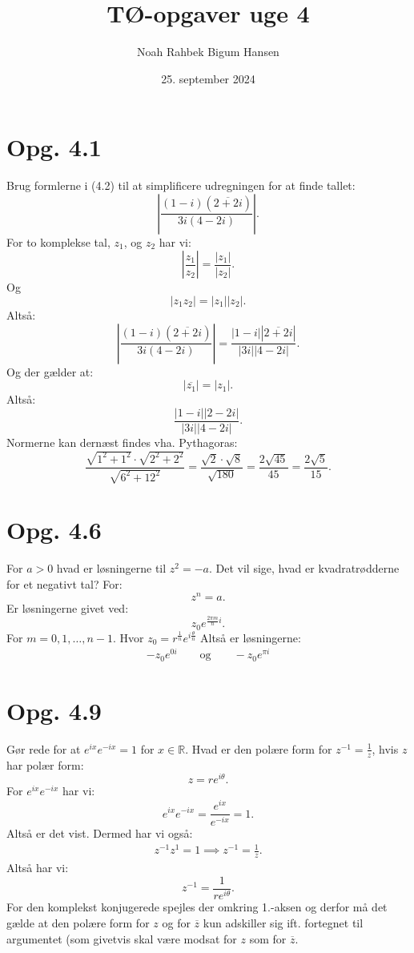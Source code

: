 \documentclass[12pt]{article}
\title{TØ-opgaver uge 4}
\author{Noah Rahbek Bigum Hansen}
\date{25. september 2024}
\begin{document}
  \section*{Opg. 4.1}
    Brug formlerne i (4.2) til at simplificere udregningen for at finde tallet:
    \[
    \left| \frac{\left( 1-i \right) \left( \overline{2+2i} \right)}{3i(4-2i)} \right|
    .\] 
    \bigbreak
    For to komplekse tal, $z_1$, og  $z_2$ har vi:
    \[
    |\frac{z_1}{z_2}| = \frac{|z_1|}{|z_2|}
    .\] 
    Og
    \[
    |z_1z_2| = |z_1| |z_2|
    .\] 
    Altså:
    \[
    \left| \frac{\left( 1-i \right) \left( \overline{2+2i} \right)}{3i(4-2i)} \right| = \frac{|1-i| |\overline{2+2i}|}{|3i| |4-2i|}
    .\] 
    Og der gælder at:
    \[
    |\overline{z_1}| = |z_1|
    .\] 
    Altså:
    \[
    \frac{|1-i| |2-2i|}{|3i| |4-2i|}
    .\]
    Normerne kan dernæst findes vha. Pythagoras:
    \[
      \frac{\sqrt{1^2 + 1^2}\cdot \sqrt{2^2+2^2} }{\sqrt{6^2+12^2}} = \frac{\sqrt{2}\cdot \sqrt{8}}{\sqrt{180}} = \frac{2 \sqrt{45}}{45} = \frac{2 \sqrt{5} }{15}
    .\]

  \section*{Opg. 4.6}
  For $a > 0$ hvad er løsningerne til $z^2=-a$. Det vil sige, hvad er kvadratrødderne for et negativt tal?
  \bigbreak
  For:
  \[
  z^n = a
  .\] 
  Er løsningerne givet ved:
  \[
  z_0e^{\frac{2\pi m}{n}i}
  .\]
  For $m = 0,1,\ldots,n-1$. Hvor $z_0 = r^{\frac{1}{n}}e^{i \frac{\theta}{n}}$
  Altså er løsningerne:
  \begin{gather*}
    -z_0e^{0i} \qquad \text{og} \qquad -z_0e^{\pi i}
  \end{gather*}

  \section*{Opg. 4.9}
  Gør rede for at $e^{ix}e^{-ix}=1$ for $x \in \mathbb{R}$. Hvad er den polære form for $z^{-1} = \frac{1}{z}$, hvis $z$ har polær form:
   \[
  z = re^{i \theta}
  .\]
  \bigbreak
  For $e^{ix}e^{-ix}$ har vi:
  \[
  e^{ix}e^{-ix} = \frac{e^{ix}}{e^{-ix}} = 1
  .\] 
  Altså er det vist. Dermed har vi også:
  \begin{align*}
    z^{-1}z^{1} = 1 \implies z^{-1} = \frac{1}{z} 
  .\end{align*}
  Altså har vi:
  \[
  z^{-1} = \frac{1}{re^{i\theta}} 
  .\] 
  For den komplekst konjugerede spejles der omkring 1.-aksen og derfor må det gælde at den polære form for $z$ og for $\overline{z}$ kun adskiller sig ift. fortegnet til argumentet (som givetvis skal være modsat for $z$ som for $\overline{z}$.
\end{document}
